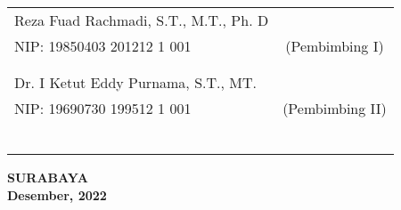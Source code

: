\noindent
\begin{tabularx}{\textwidth}{X c}
  Reza Fuad Rachmadi, S.T., M.T., Ph. D &                 \\
  NIP: 19850403 201212 1 001            & (Pembimbing I)  \\
                                        &                 \\
                                        &                 \\
  Dr. I Ketut Eddy Purnama, S.T., MT.   &                 \\
  NIP: 19690730 199512 1 001            & (Pembimbing II) \\
                                        &                 \\
                                        &                 \\
                                        &                 \\
                                        &                 \\
                                        &                 \\
                                        &                 \\
\end{tabularx}
\endgroup

\vspace{4ex}

\begin{center}
  \textbf{SURABAYA} \\
  \textbf{Desember, 2022}
\end{center}
\endgroup
